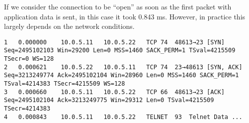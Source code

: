 If we consider the connection to be ``open'' as soon as the first packet with application data is sent, in this case it took 0.843 ms. However, in practice this largely depends on the network conditions.

\begin{lstlisting}
1	0.000000	10.0.5.11	10.0.5.22	TCP	74	48613→23 [SYN] Seq=2495102103 Win=29200 Len=0 MSS=1460 SACK_PERM=1 TSval=4215509 TSecr=0 WS=128
2	0.000621	10.0.5.22	10.0.5.11	TCP	74	23→48613 [SYN, ACK] Seq=3213249774 Ack=2495102104 Win=28960 Len=0 MSS=1460 SACK_PERM=1 TSval=4214383 TSecr=4215509 WS=128
3	0.000660	10.0.5.11	10.0.5.22	TCP	66	48613→23 [ACK] Seq=2495102104 Ack=3213249775 Win=29312 Len=0 TSval=4215509 TSecr=4214383
4	0.000843	10.0.5.11	10.0.5.22	TELNET	93	Telnet Data ...
\end{lstlisting}
